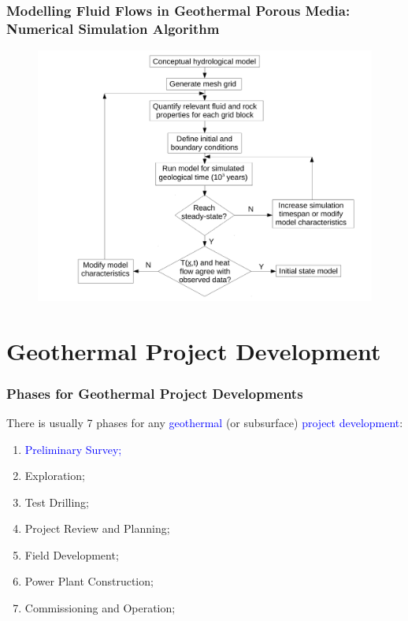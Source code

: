 \documentclass[10pt,compress]{beamer}
\newcommand{\blue}{\textcolor{blue}}
\begin{document}
\begin{frame}
 \frametitle{Modelling Fluid Flows in Geothermal Porous Media: Numerical Simulation Algorithm}

   \begin{figure}%
     \includegraphics[width=10.cm, height=7.cm, clip]{./Pics/NumericalSimulation_Fluxogram}
   \end{figure}  

\end{frame}





 \section{Geothermal Project Development} %

\begin{frame}
 \frametitle{Phases for Geothermal Project Developments} 
    There is usually 7 phases for any \blue{geothermal} (or subsurface) \blue{project development}: 
    \begin{enumerate}[1.]
       \item <1-> \blue{Preliminary Survey;}
       \item <1-> Exploration; 
       \item <1-> Test Drilling;
       \item <1-> Project Review and Planning;
       \item <1-> Field Development; 
       \item <1-> Power Plant Construction;
       \item <1-> Commissioning and Operation;
    \end{enumerate}
\end{frame}
\end{document}
